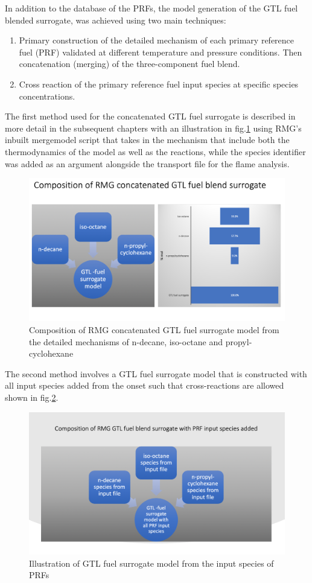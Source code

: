 In addition to the database of the PRFs, the model generation of the GTL fuel blended surrogate, was achieved using two main techniques:
\begin{enumerate}
    \item Primary construction of the detailed mechanism of each primary reference fuel (PRF) validated at different temperature and pressure conditions. Then concatenation (merging) of the three-component fuel blend.
    \item Cross reaction of the primary reference fuel input species at specific species concentrations.
\end{enumerate}

The first method used for the concatenated GTL fuel surrogate is described in more detail in the subsequent chapters with an illustration in fig.\ref{fig:gtl-surrogate} using RMG's inbuilt mergemodel script  that takes in the mechanism that include both the thermodynamics of the model as well as the reactions, while the species identifier was added as an argument alongside the transport file for the flame analysis.


\begin{figure}
\hspace*{-2cm}
    \centering
    \includegraphics[scale=0.5,keepaspectratio]{images/GTL-Constituents.png}
    \caption{Composition of RMG concatenated GTL fuel surrogate model from the detailed mechanisms of n-decane, iso-octane and propyl-cyclohexane}
    \label{fig:gtl-surrogate}
\end{figure}


The second method involves a GTL fuel surrogate model that is constructed with all input species added from the onset such that cross-reactions are allowed shown in fig.\ref{fig:gtl_cross_rxn}. 

\begin{figure}
\hspace*{-2cm}
    \centering
    \includegraphics[scale=0.5, keepaspectratio]{images/GTL-cross-rxn.png}
    \caption{Illustration of GTL fuel surrogate model from the input species of PRFs}
    \label{fig:gtl_cross_rxn}
\end{figure}